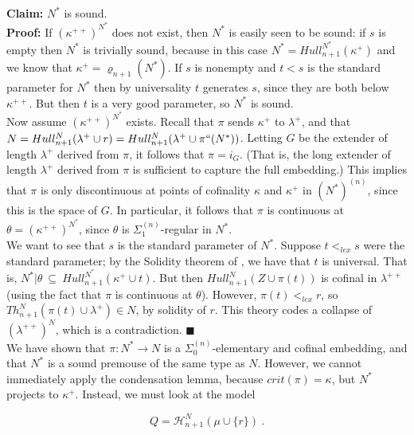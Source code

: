 \documentclass[12pt]{article}
\begin{document}
\textbf{Claim:} $N^*$ is sound.\\


\textbf{Proof:} If $(\kappa^{++})^{N^*}$ does not exist, then $N^*$ is easily seen to be sound: if $s$ is empty then $N^*$ is trivially sound, because in this case $N^* = Hull_{n+1}^{N^*} (\kappa^+ ) $ and we know that $\kappa^+ = \varrho_{n+1} (N^* )$.  If $s$ is nonempty and $t < s$ is the standard parameter for $N^*$ then by universality $t$ generates $s$, since they are both below $\kappa^{++}$.  But then $t$ is a very good parameter, so $N^*$ is sound.\\

Now assume $(\kappa^{++} )^{N^*}$ exists.  Recall that $\pi$ sends $\kappa^+$ to $\lambda^+$, and that $N = Hull_{n+1}^N (\lambda^+ \cup r) = Hull_{n+1}^N (\lambda^+ \cup \pi `` (N^*))$.  Letting $G$ be the extender of length $\lambda^+$ derived from $\pi$, it follows that $\pi = i_G$.  (That is, the long extender of length $\lambda^+$ derived from $\pi$ is sufficient to capture the full embedding.)  This implies that $\pi$ is only discontinuous at points of cofinality $\kappa$ and $\kappa^+$ in $(N^*)^{(n)}$, since this is the space of $G$.  In particular, it follows that $\pi$ is continuous at $\theta = (\kappa^{++})^{N^*}$, since $\theta$ is $\Sigma_1^{(n)}$-regular in $N^*$.\\
 
 We want to see that $s$ is the standard parameter of $N^*$.  Suppose $t <_{lex} s$ were the standard parameter; by the Solidity theorem of \cite{FSPIPM}, we have that $t$ is universal.  That is, $N^* | \theta \ \subseteq \ Hull_{n+1}^{N^*} (\kappa^+ \cup t )$.  But then $Hull_{n+1}^N ( Z \cup \pi (t))$ is cofinal in $\lambda^{++}$ (using the fact that $\pi$ is continuous at $\theta$).  However, $\pi (t) <_{lex} r$, so $Th_{n+1}^N (\pi (t) \cup \lambda^+ ) \in N$, by solidity of $r$.  This theory codes a collapse of $(\lambda^{++})^N$, which is a contradiction. $\blacksquare$\\

 
 
We have shown that $\pi : N^* \longrightarrow N$ is a $\Sigma_0^{(n)}$-elementary and cofinal embedding, and that $N^*$ is a sound premouse of the same type as $N$.  However, we cannot immediately apply the condensation lemma, because $crit (\pi) = \kappa$, but $N^*$ projects to $\kappa^+$.  Instead, we must look at the model 

\[
Q = \mathcal{H}_{n+1}^{N} ( \mu \cup \{ r \} ) \ .
\]
\end{document}
